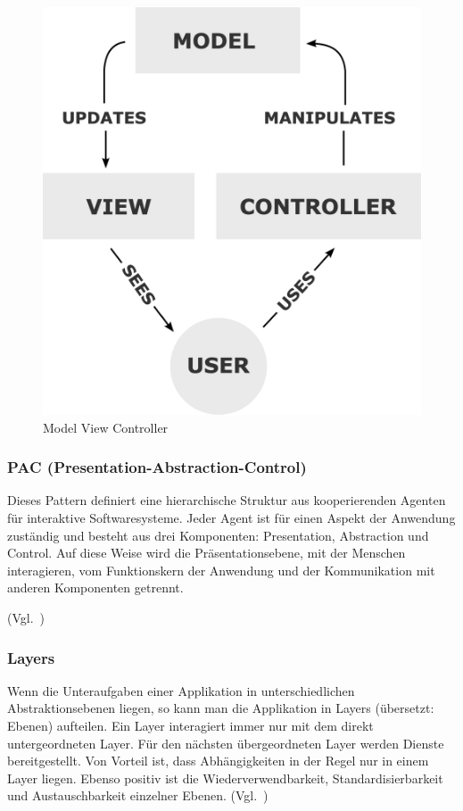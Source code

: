 \begin{figure}[h!]
    \centering
    \caption{Model View Controller}
    \label{fig:mvc}
    \includegraphics[scale=0.20]{assets/wikipedia_mvc_process}
\end{figure}

\subsubsection{PAC (Presentation-Abstraction-Control)}
Dieses Pattern definiert eine hierarchische Struktur aus kooperierenden Agenten für interaktive Softwaresysteme.
Jeder Agent ist für einen Aspekt der Anwendung zuständig und besteht aus drei Komponenten: Presentation, Abstraction und Control.
Auf diese Weise wird die Präsentationsebene, mit der Menschen interagieren, vom Funktionskern der Anwendung und der Kommunikation mit anderen Komponenten getrennt.

(Vgl.~\cite{buschmann-pattern-oriented-software-architecture})

\subsubsection{Layers}
Wenn die Unteraufgaben einer Applikation in unterschiedlichen Abstraktionsebenen liegen, so kann man die Applikation in Layers (übersetzt: Ebenen) aufteilen.
Ein Layer interagiert immer nur mit dem direkt untergeordneten Layer.
Für den nächsten übergeordneten Layer werden Dienste bereitgestellt.
Von Vorteil ist, dass Abhängigkeiten in der Regel nur in einem Layer liegen.
Ebenso positiv ist die Wiederverwendbarkeit, Standardisierbarkeit und Austauschbarkeit einzelner Ebenen.
(Vgl.~\cite{buschmann-pattern-oriented-software-architecture})

